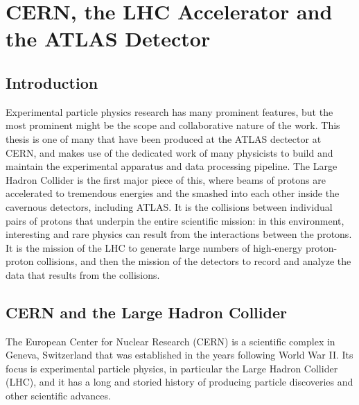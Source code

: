  

\chapter[ATLAS Detector]{CERN, the LHC Accelerator and the ATLAS Detector}




\section{Introduction}
Experimental particle physics research has many prominent features, but the most prominent
might be the scope and collaborative nature of the work.  This thesis is one of many that have
been produced at the ATLAS dectector at CERN, and makes use of the dedicated work of many
physicists to build and maintain the experimental apparatus and data processing pipeline.
The Large Hadron Collider is the first major piece of this, where beams of protons are accelerated to
tremendous energies and the smashed into each other inside the cavernous detectors, including ATLAS.
It is the collisions
between individual pairs of protons that underpin the entire scientific mission: in this environment,
interesting and rare physics can result from the interactions between the protons.  It is the mission of the
LHC to generate large numbers of high-energy proton-proton collisions, and then the mission of the detectors
to record and analyze the data that results from the collisions.  



\section{CERN and the Large Hadron Collider}
\label{sec:cern_lhc}
The European Center for Nuclear Research (CERN) is a scientific complex in Geneva, Switzerland that was established 
in the years following World War II.  Its focus is experimental particle physics, in particular the Large Hadron 
Collider (LHC), and it has a long and storied history of producing particle discoveries and other scientific
advances.

